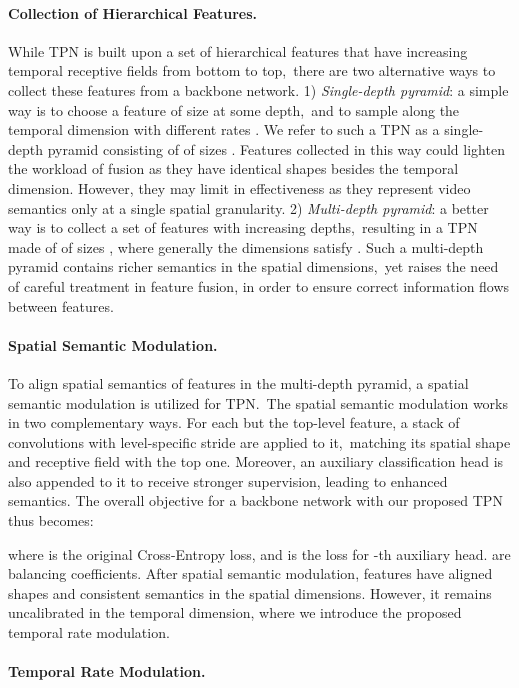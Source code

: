 \documentclass[10pt,twocolumn,letterpaper]{article}
\begin{document}
\paragraph{Collection of Hierarchical Features.}
While TPN is built upon a set of  hierarchical features that have increasing temporal receptive fields from bottom to top,\
there are two alternative ways to collect these features from a backbone network.
1) \emph{Single-depth pyramid}: a simple way is to choose a feature  of size  at some depth,\
and to sample along the temporal dimension with  different rates .
We refer to such a TPN as a single-depth pyramid consisting of  of sizes .
Features collected in this way could lighten the workload of fusion as they have identical shapes besides the temporal dimension.
However, they may limit in effectiveness as they represent video semantics only at a single spatial granularity.
2) \emph{Multi-depth pyramid}: a better way is to collect a set of  features with increasing depths,\
resulting in a TPN made of  of sizes ,
where generally the dimensions satisfy . 
Such a multi-depth pyramid contains richer semantics in the spatial dimensions,\
yet raises the need of careful treatment in feature fusion,
in order to ensure correct information flows between features.

\paragraph{Spatial Semantic Modulation.} 

To align spatial semantics of features in the multi-depth pyramid, a spatial semantic modulation is utilized for TPN.\
The spatial semantic modulation works in two complementary ways.
For each but the top-level feature, a stack of convolutions with level-specific stride are applied to it,\
matching its spatial shape and receptive field with the top one.
Moreover, an auxiliary classification head is also appended to it to receive stronger supervision, leading to enhanced semantics.
The overall objective for a backbone network with our proposed TPN thus becomes:

where  is the original Cross-Entropy loss, and  is the loss for -th auxiliary head.  are balancing coefficients. 
After spatial semantic modulation, features have aligned shapes and consistent semantics in the spatial dimensions.
However, it remains uncalibrated in the temporal dimension, where we introduce the proposed temporal rate modulation.

\paragraph{Temporal Rate Modulation.} 
\end{document}
